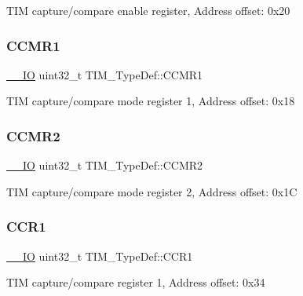 T\+IM capture/compare enable register, Address offset\+: 0x20 \mbox{\label{struct_t_i_m___type_def_a0f2291e7efdf3222689ef13e9be2ea4a}} 
\subsubsection{\texorpdfstring{C\+C\+M\+R1}{CCMR1}}
{\footnotesize\ttfamily \hyperlink{core__sc300_8h_aec43007d9998a0a0e01faede4133d6be}{\+\_\+\+\_\+\+IO} uint32\+\_\+t T\+I\+M\+\_\+\+Type\+Def\+::\+C\+C\+M\+R1}

T\+IM capture/compare mode register 1, Address offset\+: 0x18 \mbox{\label{struct_t_i_m___type_def_aa8129ca70a2232c91c8cfcaf375249f6}} 
\subsubsection{\texorpdfstring{C\+C\+M\+R2}{CCMR2}}
{\footnotesize\ttfamily \hyperlink{core__sc300_8h_aec43007d9998a0a0e01faede4133d6be}{\+\_\+\+\_\+\+IO} uint32\+\_\+t T\+I\+M\+\_\+\+Type\+Def\+::\+C\+C\+M\+R2}

T\+IM capture/compare mode register 2, Address offset\+: 0x1C \mbox{\label{struct_t_i_m___type_def_a0dd9c06729a5eb6179c6d0d60faca7ed}} 
\subsubsection{\texorpdfstring{C\+C\+R1}{CCR1}}
{\footnotesize\ttfamily \hyperlink{core__sc300_8h_aec43007d9998a0a0e01faede4133d6be}{\+\_\+\+\_\+\+IO} uint32\+\_\+t T\+I\+M\+\_\+\+Type\+Def\+::\+C\+C\+R1}

T\+IM capture/compare register 1, Address offset\+: 0x34 \mbox{\label{struct_t_i_m___type_def_a4d1171e9a61538424b8ef1f2571986d0}} 
